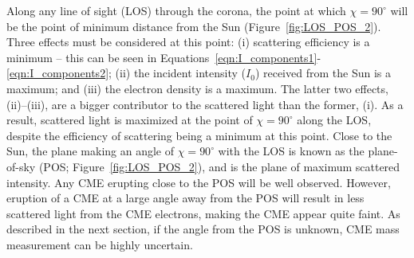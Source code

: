 
Along any line of sight (LOS) through the corona, the point at which $\chi = 90^{\circ}$ will be the point of minimum distance from the Sun (Figure~\ref{fig:LOS_POS_2}). Three effects must be considered at this point: (i) scattering efficiency is a minimum -- this can be seen in Equations~\ref{eqn:I_components1}-\ref{eqn:I_components2}; (ii) the incident intensity ($I_0$) received from the Sun is a maximum; and (iii) the electron density is a maximum. The latter two effects, (ii)--(iii), are a bigger contributor to the scattered light than the former, (i). As a result, scattered light is maximized at the point of $\chi = 90^{\circ}$ along the LOS, despite the efficiency of scattering being a minimum at this point. Close to the Sun, the plane making an angle of $\chi = 90^{\circ}$ with the LOS is known as the plane-of-sky (POS; Figure~\ref{fig:LOS_POS_2}), and is the plane of maximum scattered intensity. Any CME erupting close to the POS will be well observed. However, eruption of a CME at a large angle away from the POS will result in less scattered light from the CME electrons, making the CME appear quite faint. As described in the next section, if the angle from the POS is unknown, CME mass measurement can be highly uncertain. 


